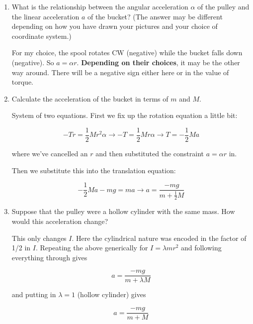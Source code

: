 \documentclass[12pt]{article}
\begin{document}
\begin{enumerate}
{}

\vspace{2in}


\newpage

\item What is the relationship between the angular acceleration $\alpha$ of the pulley and the linear acceleration
$a$ of the bucket? (The answer may be different depending on how you have drawn your pictures and your choice of
coordinate system.)


{\color{red}

For my choice, the spool rotates CW (negative) while the bucket falls down (negative). So $a = \alpha r$. {\bf Depending on their choices}, it may be the other way around. There will be a negative sign either here or in the value of torque.

}

\vspace{1in}

\item Calculate the acceleration of the bucket in terms of $m$ and $M$.


{\color{red}

System of two equations. First we fix up the rotation equation a little bit:

$$-Tr = \frac{1}{2}Mr^2 \alpha \rightarrow -T = \frac{1}{2}Mr\alpha \rightarrow T = -\frac{1}{2}Ma$$

where we've cancelled an $r$ and then substituted the constraint $a = \alpha r$ in.

Then we substitute this into the translation equation:

$$-\frac{1}{2}Ma - mg = ma  \rightarrow a = \frac{-mg}{m+\frac{1}{2}M}$$





}


\vspace{3in}

\item Suppose that the pulley were a hollow cylinder with the same mass. How would this acceleration change?

 
 {\color{red}
This only changes $I$. Here the cylindrical nature was encoded in the factor of 1/2 in $I$. Repeating the above generically for $I=\lambda mr^2$ and following everything through gives


 $$a = \frac{-mg}{m+\lambda M}$$
 
 and putting in $\lambda=1$ (hollow cylinder) gives
 
 $$a = \frac{-mg}{m+M}$$
}
 


\end{enumerate}
\end{document}
